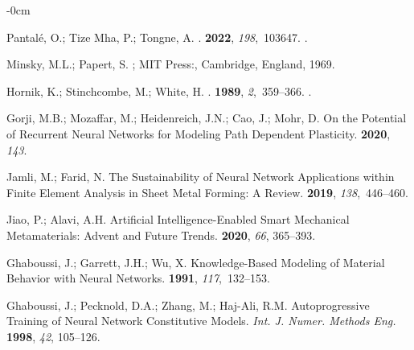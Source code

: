 \documentclass[algorithms,article,accept,pdftex,moreauthors]{Definitions/mdpi}
\begin{document}
\begin{adjustwidth}{-\extralength}{0cm}
\begin{thebibliography}{999}
Pantal{\'e}, O.; {Tize Mha}, P.; Tongne, A.
.
 {\bf 2022}, {\em
  198},~103647.
.

Minsky, M.L.; Papert, S.
;
  MIT Press:, Cambridge, England, 1969.

Hornik, K.; Stinchcombe, M.; White, H.
.
 {\bf 1989}, {\em 2},~359--366.
.

Gorji, M.B.; Mozaffar, M.; Heidenreich, J.N.; Cao, J.; Mohr, D.
\newblock On the Potential of Recurrent Neural Networks for Modeling Path
  Dependent Plasticity.
 {\bf 2020}, {\em
  143}.

Jamli, M.; Farid, N.
\newblock The Sustainability of Neural Network Applications within Finite
  Element Analysis in Sheet Metal Forming: {{A}} Review.
 {\bf 2019}, {\em 138},~446--460.

Jiao, P.; Alavi, A.H.
\newblock Artificial Intelligence-Enabled Smart Mechanical Metamaterials:
  Advent and Future Trends.
 {\bf 2020}, \emph{66}, 365--393.

Ghaboussi, J.; Garrett, J.H.; Wu, X.
\newblock Knowledge-{{Based Modeling}} of {{Material Behavior}} with {{Neural
  Networks}}.
 {\bf 1991}, {\em
  117},~132--153.

Ghaboussi, J.; Pecknold, D.A.; Zhang, M.; {Haj-Ali}, R.M.
\newblock Autoprogressive Training of Neural Network Constitutive Models. \emph{ Int. J. Numer. Methods Eng.} \textbf{1998}, \emph{42}, 105--126.


\end{thebibliography}
\end{adjustwidth}
\end{document}
